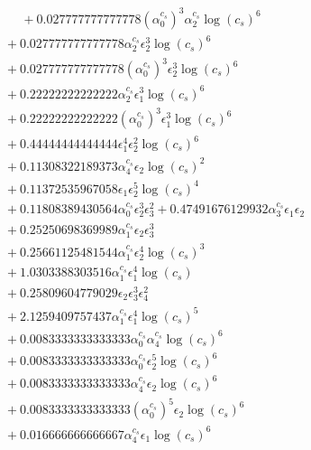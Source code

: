 \documentclass[10pt]{article}
\begin{document}
\begin{align*}
\phantom{F_{s,6}} &\phantom{={}}{}  + 0.027777777777778 \left(\alpha_{0}^{c_s}\right)^{3} \alpha_{2}^{c_s} \log{\left(c_{s} \right)}^{6} \\
&{}  + 0.027777777777778 \alpha_{2}^{c_s} \epsilon_{2}^{3} \log{\left(c_{s} \right)}^{6} \\
&{}  + 0.027777777777778 \left(\alpha_{0}^{c_s}\right)^{3} \epsilon_{2}^{3} \log{\left(c_{s} \right)}^{6} \\
&{}  + 0.22222222222222 \alpha_{2}^{c_s} \epsilon_{1}^{3} \log{\left(c_{s} \right)}^{6} \\
&{}  + 0.22222222222222 \left(\alpha_{0}^{c_s}\right)^{3} \epsilon_{1}^{3} \log{\left(c_{s} \right)}^{6} \\
&{}  + 0.44444444444444 \epsilon_{1}^{4} \epsilon_{2}^{2} \log{\left(c_{s} \right)}^{6} \\
&{}  + 0.11308322189373 \alpha_{4}^{c_s} \epsilon_{2} \log{\left(c_{s} \right)}^{2} \\
&{}  + 0.11372535967058 \epsilon_{1} \epsilon_{2}^{5} \log{\left(c_{s} \right)}^{4} \\
&{}  + 0.11808389430564 \alpha_{0}^{c_s} \epsilon_{2}^{3} \epsilon_{3}^{2} + 0.47491676129932 \alpha_{3}^{c_s} \epsilon_{1} \epsilon_{2} \\
&{}  + 0.25250698369989 \alpha_{1}^{c_s} \epsilon_{2} \epsilon_{3}^{3} \\
&{}  + 0.25661125481544 \alpha_{1}^{c_s} \epsilon_{2}^{4} \log{\left(c_{s} \right)}^{3} \\
&{}  + 1.0303388303516 \alpha_{1}^{c_s} \epsilon_{1}^{4} \log{\left(c_{s} \right)} \\
&{}  + 0.25809604779029 \epsilon_{2} \epsilon_{3}^{3} \epsilon_{4}^{2} \\
&{}  + 2.1259409757437 \alpha_{1}^{c_s} \epsilon_{1}^{4} \log{\left(c_{s} \right)}^{5} \\
&{}  + 0.0083333333333333 \alpha_{0}^{c_s} \alpha_{4}^{c_s} \log{\left(c_{s} \right)}^{6} \\
&{}  + 0.0083333333333333 \alpha_{0}^{c_s} \epsilon_{2}^{5} \log{\left(c_{s} \right)}^{6} \\
&{}  + 0.0083333333333333 \alpha_{4}^{c_s} \epsilon_{2} \log{\left(c_{s} \right)}^{6} \\
&{}  + 0.0083333333333333 \left(\alpha_{0}^{c_s}\right)^{5} \epsilon_{2} \log{\left(c_{s} \right)}^{6} \\
&{}  + 0.016666666666667 \alpha_{4}^{c_s} \epsilon_{1} \log{\left(c_{s} \right)}^{6} \\

\end{align*}
\end{document}

